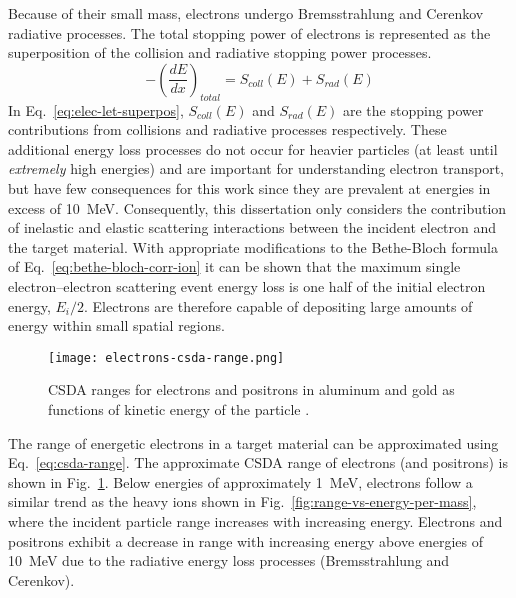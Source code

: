 Because of their small mass, electrons undergo Bremsstrahlung and Cerenkov radiative processes.
The total stopping power of electrons is represented as the superposition of the collision and radiative stopping power processes.
\begin{equation}
    \label{eq:elec-let-superpos}
    -\left(\frac{dE}{dx}\right)_{total} = S_{coll}(E) + S_{rad}(E)
\end{equation}
In Eq.~\ref{eq:elec-let-superpos}, $S_{coll}(E)$ and $S_{rad}(E)$ are the stopping power contributions from collisions and radiative processes respectively.
These additional energy loss processes do not occur for heavier particles (at least until \emph{extremely} high energies) and are important for understanding electron transport, but have few consequences for this work since they are prevalent at energies in excess of 10~MeV.
Consequently, this dissertation only considers the contribution of inelastic and elastic scattering interactions between the incident electron and the target material.
With appropriate modifications to the Bethe-Bloch formula of Eq.~\ref{eq:bethe-bloch-corr-ion} it can be shown that the maximum single electron--electron scattering event energy loss is one half of the initial electron energy, $E_i/2$.
Electrons are therefore capable of depositing large amounts of energy within small spatial regions.

\begin{figure}[tb]
    \begin{center}
        \texttt{[image: electrons-csda-range.png]}
    \end{center}
    \caption[CSDA ranges for electrons and positrons in aluminum and gold as functions of kinetic energy of the particle.]{CSDA ranges for electrons and positrons in aluminum and gold as functions of kinetic energy of the particle \cite{Salvat:ue}.}
    \label{fig:csda-range-electrons}
\end{figure}

The range of energetic electrons in a target material can be approximated using Eq.~\ref{eq:csda-range}.
The approximate CSDA range of electrons (and positrons) is shown in Fig.~\ref{fig:csda-range-electrons}.
Below energies of approximately 1~MeV, electrons follow a similar trend as the heavy ions shown in Fig.~\ref{fig:range-vs-energy-per-mass}, where the incident particle range increases with increasing energy.
Electrons and positrons exhibit a decrease in range with increasing energy above energies of 10~MeV due to the radiative energy loss processes (Bremsstrahlung and Cerenkov).

